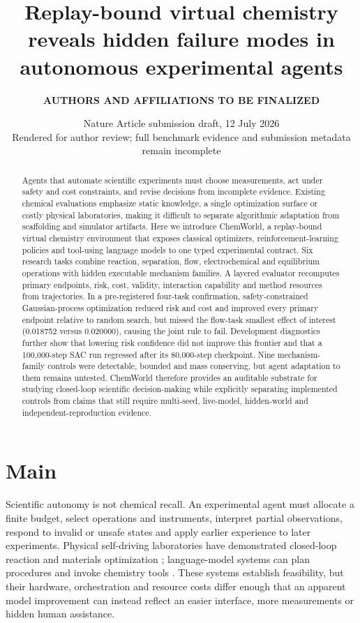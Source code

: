\documentclass[11pt]{article}
\title{\textbf{Replay-bound virtual chemistry reveals hidden failure modes in autonomous experimental agents}}
\author{\textbf{AUTHORS AND AFFILIATIONS TO BE FINALIZED}}
\date{Nature Article submission draft, 12 July 2026\\
\textcolor{blocked}{Rendered for author review; full benchmark evidence and submission metadata remain incomplete}}
\begin{document}
\maketitle

\begin{abstract}
Agents that automate scientific experiments must choose measurements, act under safety and cost constraints, and revise decisions from incomplete evidence. Existing chemical evaluations emphasize static knowledge, a single optimization surface or costly physical laboratories, making it difficult to separate algorithmic adaptation from scaffolding and simulator artifacts. Here we introduce ChemWorld, a replay-bound virtual chemistry environment that exposes classical optimizers, reinforcement-learning policies and tool-using language models to one typed experimental contract. Six research tasks combine reaction, separation, flow, electrochemical and equilibrium operations with hidden executable mechanism families. A layered evaluator recomputes primary endpoints, risk, cost, validity, interaction capability and method resources from trajectories. In a pre-registered four-task confirmation, safety-constrained Gaussian-process optimization reduced risk and cost and improved every primary endpoint relative to random search, but missed the flow-task smallest effect of interest (0.018752 versus 0.020000), causing the joint rule to fail. Development diagnostics further show that lowering risk confidence did not improve this frontier and that a 100,000-step SAC run regressed after its 80,000-step checkpoint. Nine mechanism-family controls were detectable, bounded and mass conserving, but agent adaptation to them remains untested. ChemWorld therefore provides an auditable substrate for studying closed-loop scientific decision-making while explicitly separating implemented controls from claims that still require multi-seed, live-model, hidden-world and independent-reproduction evidence.
\end{abstract}

\section*{Main}

Scientific autonomy is not chemical recall. An experimental agent must allocate a finite budget, select operations and instruments, interpret partial observations, respond to invalid or unsafe states and apply earlier experience to later experiments. Physical self-driving laboratories have demonstrated closed-loop reaction and materials optimization \citep{shields2021bo,szymanski2023alab,abolhasani2023sdl}; language-model systems can plan procedures and invoke chemistry tools \citep{boiko2023coscientist,bran2024chemcrow}. These systems establish feasibility, but their hardware, orchestration and resource costs differ enough that an apparent model improvement can instead reflect an easier interface, more measurements or hidden human assistance.
\end{document}
